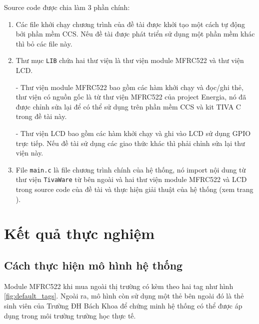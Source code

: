 Source code được chia làm 3 phần chính:
\begin{enumerate}
    \item Các file khởi chạy chương trình của đề tài được khởi tạo một cách tự động bởi phần mềm CCS.
        Nếu đề tài được phát triển sử dụng một phần mềm khác thì bỏ các file này.
    \item Thư mục \texttt{LIB} chứa hai thư viện là thư viện module MFRC522 và thư viện LCD.

        - Thư viện module MFRC522 bao gồm các hàm khởi chạy và đọc/ghi thẻ,
        thư viện có nguồn gốc là từ thư viện MFRC522 của project Energia,
        nó đã được chỉnh sửa lại để có thể sử dụng trên phần mềm CCS và kit TIVA C trong đề tài này.

        - Thư viện LCD bao gồm các hàm khởi chạy và ghi vào LCD sử dụng GPIO trực tiếp.
        Nếu đề tài sử dụng các giao thức khác thì phải chỉnh sửa lại thư viện này.
    \item File \texttt{main.c} là file chương trình chính của hệ thống,
        nó import nội dung từ thư viện \texttt{TivaWare} từ bên ngoài và hai thư viện module MFRC522 và LCD trong source code của đề tài và thực hiện giải thuật của hệ thống (xem trang \pageref{ref:algorithm}).
\end{enumerate}

\chapter{Kết quả thực nghiệm}
\section{Cách thực hiện mô hình hệ thống}
Module MFRC522 khi mua ngoài thị trường có kèm theo hai tag như hình \ref{fig:default_tags}.
Ngoài ra, mô hình còn sử dụng một thẻ bên ngoài đó là thẻ sinh viên của Trường ĐH Bách Khoa
để chứng minh hệ thống có thể được áp dụng trong môi trường trường học thực tế.

